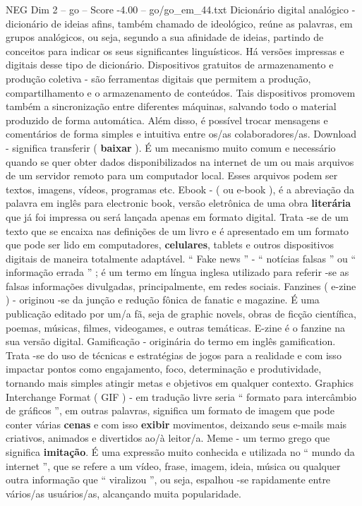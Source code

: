 \begin{textsample}{NEG Dim 2 – go – Score -4.00 – go/go\_em\_44.txt}
Dicionário digital analógico - dicionário de ideias afins, também chamado de ideológico, reúne as palavras, em grupos analógicos, ou seja, segundo a sua afinidade de ideias, partindo de conceitos para indicar os seus significantes linguísticos.
Há versões impressas e digitais desse tipo de dicionário.
Dispositivos gratuitos de armazenamento e produção coletiva - são ferramentas digitais que permitem a produção, compartilhamento e o armazenamento de conteúdos.
Tais dispositivos promovem também a sincronização entre diferentes máquinas, salvando todo o material produzido de forma automática.
Além disso, é possível trocar mensagens e comentários de forma simples e intuitiva entre os/as colaboradores/as.
Download - significa transferir ( \textbf{baixar} ).
É um mecanismo muito comum e necessário quando se quer obter dados disponibilizados na internet de um ou mais arquivos de um servidor remoto para um computador local.
Esses arquivos podem ser textos, imagens, vídeos, programas etc.
Ebook - ( ou e-book ), é a abreviação da palavra em inglês para electronic book, versão eletrônica de uma obra \textbf{literária} que já foi impressa ou será lançada apenas em formato digital.
Trata -se de um texto que se encaixa nas definições de um livro e é apresentado em um formato que pode ser lido em computadores, \textbf{celulares}, tablets e outros dispositivos digitais de maneira totalmente adaptável. “ Fake news ” - “ notícias falsas ” ou “ informação errada ” ; é um termo em língua inglesa utilizado para referir -se as falsas informações divulgadas, principalmente, em redes sociais.
Fanzines ( e-zine ) - originou -se da junção e redução fônica de fanatic e magazine.
É uma publicação editado por um/a fã, seja de graphic novels, obras de ficção científica, poemas, músicas, filmes, videogames, e outras temáticas.
E-zine é o fanzine na sua versão digital.
Gamificação - originária do termo em inglês gamification.
Trata -se do uso de técnicas e estratégias de jogos para a realidade e com isso impactar pontos como engajamento, foco, determinação e produtividade, tornando mais simples atingir metas e objetivos em qualquer contexto.
Graphics Interchange Format ( GIF ) - em tradução livre seria “ formato para intercâmbio de gráficos ”, em outras palavras, significa um formato de imagem que pode conter várias \textbf{cenas} e com isso \textbf{exibir} movimentos, deixando seus e-mails mais criativos, animados e divertidos ao/à leitor/a.
Meme - um termo grego que significa \textbf{imitação}.
É uma expressão muito conhecida e utilizada no “ mundo da internet ”, que se refere a um vídeo, frase, imagem, ideia, música ou qualquer outra informação que “ viralizou ”, ou seja, espalhou -se rapidamente entre vários/as usuários/as, alcançando muita popularidade.

\end{textsample}
